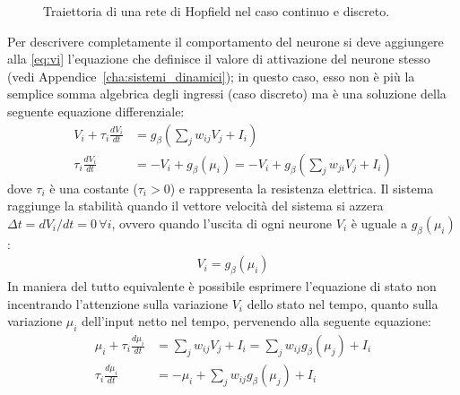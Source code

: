 \begin{figure}[h!]
	\centering
	\quad
	\caption{Traiettoria di una rete di Hopfield nel caso continuo e discreto.}
\end{figure}
Per descrivere completamente il comportamento del neurone si deve aggiungere alla \eqref{eq:vi} l'equazione che definisce il valore di attivazione del neurone stesso (vedi Appendice~\ref{cha:sistemi_dinamici}); in questo caso, esso non è più la semplice somma algebrica degli ingressi (caso discreto) ma è una soluzione della seguente equazione differenziale:
\begin{align*}
	V_i + \tau_i \frac{d V_i}{dt} &= g_\beta \left(\sum_{j} w_{ij} V_j + I_i \right) \\
	\tau_i \frac{d V_i}{dt} &= - V_i + g_\beta(\mu_i) = - V_i + g_\beta \left(\sum_j w_{ji} V_j + I_i \right)
\end{align*}
dove $\tau_i$ è una costante ($\tau_i > 0$) e rappresenta la resistenza elettrica. Il sistema raggiunge la stabilità quando il vettore velocità del sistema si azzera $\Delta t = dV_i / dt= 0 \, \forall i$, ovvero quando l'uscita di ogni neurone $V_i$ è uguale a $g_\beta(\mu_i)$:
\begin{align*}
	V_i = g_\beta(\mu_i)
\end{align*}
In maniera del tutto equivalente è possibile esprimere l’equazione di stato non incentrando l’attenzione sulla variazione $V_i$ dello stato nel tempo, quanto sulla variazione $\mu_i$ dell’input netto nel tempo, pervenendo alla seguente equazione:
\begin{align}
	\mu_i + \tau_i \frac{d\mu_i}{dt} &= \sum_j w_{ij} V_j + I_i = \sum_j w_{ij} g_\beta (\mu_j) + I_i \\
	\tau_i \frac{d\mu_i}{dt} &= -\mu_i + \sum_j w_{ij} g_\beta (\mu_j) + I_i \label{eq:mu}
\end{align}

